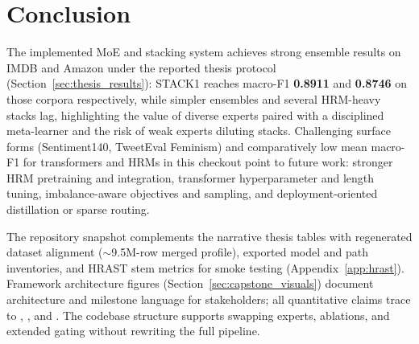 \section{Conclusion}
\label{sec:conclusion}

The implemented MoE and stacking system achieves strong ensemble results on IMDB and Amazon under the reported thesis protocol (Section~\ref{sec:thesis_results}): STACK1 reaches macro-F1 \textbf{0.8911} and \textbf{0.8746} on those corpora respectively, while simpler ensembles and several HRM-heavy stacks lag, highlighting the value of diverse experts paired with a disciplined meta-learner and the risk of weak experts diluting stacks. Challenging surface forms (Sentiment140, TweetEval Feminism) and comparatively low mean macro-F1 for transformers and HRMs in this checkout point to future work: stronger HRM pretraining and integration, transformer hyperparameter and length tuning, imbalance-aware objectives and sampling, and deployment-oriented distillation or sparse routing.

The repository snapshot complements the narrative thesis tables with regenerated dataset alignment (\(\sim\)9.5M-row merged profile), exported model and path inventories, and HRAST stem metrics for smoke testing (Appendix~\ref{app:hrast}). Framework architecture figures (Section~\ref{sec:capstone_visuals}) document architecture and milestone language for stakeholders; all quantitative claims trace to , , and . The codebase structure supports swapping experts, ablations, and extended gating without rewriting the full pipeline.
